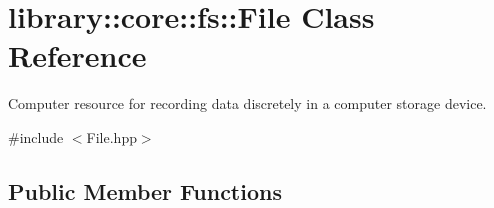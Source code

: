\hypertarget{classlibrary_1_1core_1_1fs_1_1File}{}\section{library\+:\+:core\+:\+:fs\+:\+:File Class Reference}
\label{classlibrary_1_1core_1_1fs_1_1File}


Computer resource for recording data discretely in a computer storage device.  




{\ttfamily \#include $<$File.\+hpp$>$}

\subsection*{Public Member Functions}
